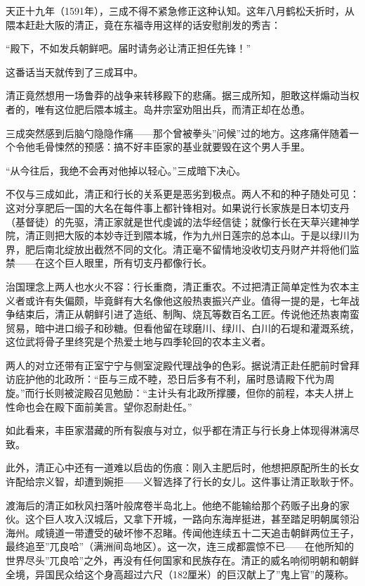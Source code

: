 \documentclass[
]{article}
\begin{document}
天正十九年（1591年），三成不得不紧急修正这种认知。这年八月鹤松夭折时，从隈本赶赴大阪的清正，竟在东福寺用这样的话安慰削发的秀吉：

``殿下，不如发兵朝鲜吧。届时请务必让清正担任先锋！''

这番话当天就传到了三成耳中。

清正竟然想用一场鲁莽的战争来转移殿下的悲痛。据三成所知，胆敢这样煽动当权者的，唯有这位肥后隈本城主。岛井宗室劝阻出兵，而清正却在怂恿。

三成突然感到后脑勺隐隐作痛------那个曾被拳头''问候''过的地方。这疼痛伴随着一个令他毛骨悚然的预感：搞不好丰臣家的基业就要毁在这个男人手里。

``从今往后，我绝不会再对他掉以轻心。''三成暗下决心。

不仅与三成如此，清正和行长的关系更是恶劣到极点。两人不和的种子随处可见：这对分享肥后一国的大名在每件事上都针锋相对。如果说行长家族是日本切支丹（基督徒）的先驱，清正家就是世代虔诚的法华经信徒；就像行长在天草兴建神学院，清正则把大阪的本妙寺迁到隈本城，作为九州日莲宗的总本山。于是以绿川为界，肥后南北绽放出截然不同的文化。清正毫不留情地没收切支丹财产并将他们监禁------在这个巨人眼里，所有切支丹都像行长。

治国理念上两人也水火不容：行长重商，清正重农。不过把清正简单定性为农本主义者或许有失偏颇，毕竟鲜有大名像他这般热衷振兴产业。值得一提的是，七年战争结束后，清正从朝鲜引进了造纸、制陶、烧瓦等数百名工匠。传说他还热衷南蛮贸易，暗中进口缎子和砂糖。但看他留在球磨川、绿川、白川的石堤和灌溉系统，这位武将骨子里终究是个热爱土地与四季轮回的农本主义者。

两人的对立还带有正室宁宁与侧室淀殿代理战争的色彩。据说清正赴任肥前时曾拜访庇护他的北政所：``臣与三成不睦，恐日后多有不利，届时恳请殿下代为周旋。''而行长则被淀殿召见勉励：``主计头有北政所撑腰，但你的前程，本夫人拼上性命也会在殿下面前美言。望你忍耐赴任。''

如此看来，丰臣家潜藏的所有裂痕与对立，似乎都在清正与行长身上体现得淋漓尽致。

此外，清正心中还有一道难以启齿的伤痕：刚入主肥后时，他想把原配所生的长女许配给宗义智，却遭到婉拒------义智选择了行长的女儿。这件事让清正耿耿于怀。

渡海后的清正如秋风扫落叶般席卷半岛北上。他绝不能输给那个药贩子出身的家伙。这个巨人攻入汉城后，又拿下开城，一路向东海岸挺进，甚至踏足明朝属领沿海州。咸镜道一带遭受的破坏惨不忍睹。传闻他连续五十二天追击朝鲜两位王子，最终追至''兀良哈''（满洲间岛地区）。这一次，连三成都震惊不已------在他所知的世界尽头''兀良哈''之外，再没有任何国家和民族存在。清正的威名响彻明朝和朝鲜全境，异国民众给这个身高超过六尺（182厘米）的巨汉献上了''鬼上官''的蔑称。
\end{document}
